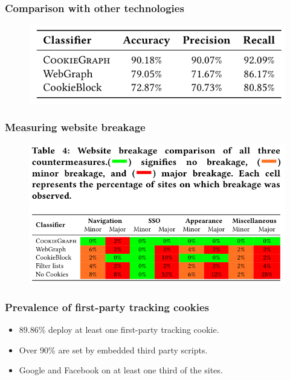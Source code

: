 \documentclass{beamer}
\begin{document}
\begin{frame}
\frametitle{Comparison with other technologies}

\begin{figure}
\includegraphics[scale=0.5]{img/classacc}
\end{figure}

\end{frame}

\begin{frame}
\frametitle{Measuring website breakage}

\begin{figure}
\includegraphics[scale=0.5]{img/breakage}
\end{figure}

\end{frame}

\begin{frame}
\frametitle{Prevalence of first-party tracking cookies}

\begin{itemize}
\item 89.86\% deploy at least one first-party tracking cookie.
\item Over 90\% are set by embedded third party scripts. 
\item Google and Facebook on at least one third of the sites.
\end{itemize}

\end{frame}
\end{document}
